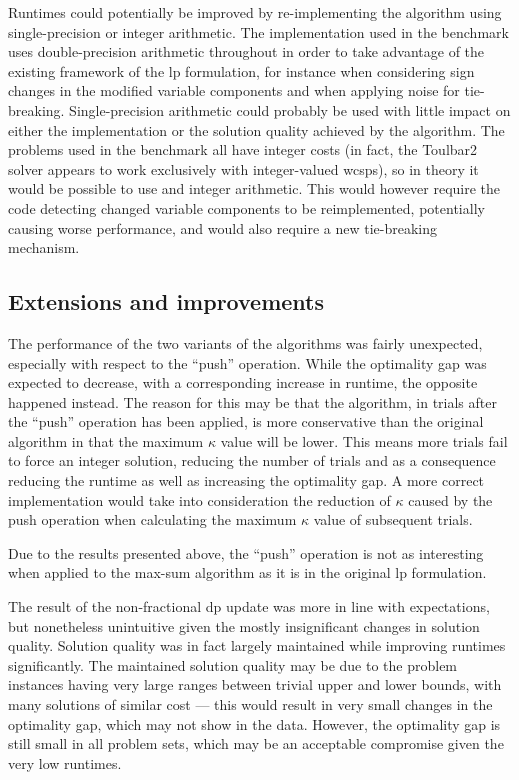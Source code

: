 Runtimes could potentially be improved by re-implementing the algorithm using single-precision or integer arithmetic.
The implementation used in the benchmark uses double-precision arithmetic throughout in order to take advantage of the existing framework of the \gls{lp} formulation, for instance when considering sign changes in the modified variable components and when applying noise for tie-breaking.
Single-precision arithmetic could probably be used with little impact on either the implementation or the solution quality achieved by the algorithm.
The problems used in the benchmark all have integer costs (in fact, the Toulbar2 solver appears to work exclusively with integer-valued \glspl{wcsp}), so in theory it would be possible to use and integer arithmetic.
This would however require the code detecting changed variable components to be reimplemented, potentially causing worse performance, and would also require a new tie-breaking mechanism.

\subsection{Extensions and improvements}
The performance of the two variants of the algorithms was fairly unexpected, especially with respect to the \enquote{push} operation.
While the optimality gap was expected to decrease, with a corresponding increase in runtime, the opposite happened instead.
The reason for this may be that the algorithm, in trials after the \enquote{push} operation has been applied, is more conservative than the original algorithm in that the maximum \(\kappa\) value will be lower. This means more trials fail to force an integer solution, reducing the number of trials and as a consequence reducing the runtime as well as increasing the optimality gap.
A more correct implementation would take into consideration the reduction of \(\kappa\) caused by the push operation when calculating the maximum \(\kappa\) value of subsequent trials.

Due to the results presented above, the \enquote{push} operation is not as interesting when applied to the max-sum algorithm as it is in the original \gls{lp} formulation.

The result of the non-fractional \gls{dp} update was more in line with expectations, but nonetheless unintuitive given the mostly insignificant changes in solution quality.
Solution quality was in fact largely maintained while improving runtimes significantly.
The maintained solution quality may be due to the problem instances having very large ranges between trivial upper and lower bounds, with many solutions of similar cost --- this would result in very small changes in the optimality gap, which may not show in the data.
However, the optimality gap is still small in all problem sets, which may be an acceptable compromise given the very low runtimes.

